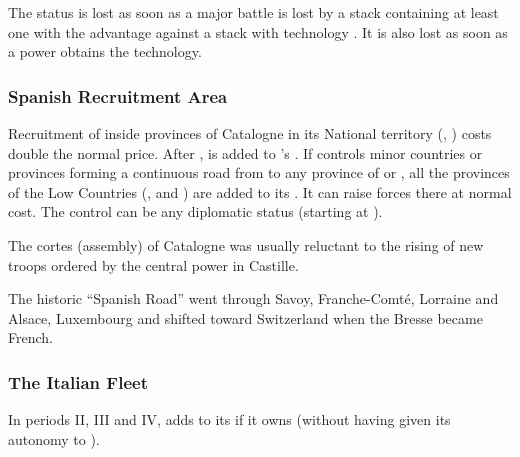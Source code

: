 \aparag The \TTER status is lost as soon as a major battle is lost by a
stack containing at least one \ARMY\faceplus with the \TTER advantage
against a stack with technology \TBAR.
\bparag It is also lost as soon as a power obtains the \TMAN technology.


\subsubsection{Spanish Recruitment Area}\label{chSpecific:Spain:Recruitment
  Area}
 Recruitment of \HIS inside provinces of
Catalogne in its National territory (\provinceCatalunya,
\provincePirineos) costs double the normal price.
 After ,
 is added to \SPA's .
 If \SPA controls minor countries or provinces
forming a continuous road from  to any province of
 or , all the provinces of the Low
Countries (\paysProvincesne, \paysHollande and \paysBourgogne) are added
to its . It can raise forces there at normal
cost. The control can be any diplomatic status (starting at \RM).
\begin{histoire}
  The cortes (assembly) of Catalogne was usually reluctant to the rising
  of new troops ordered by the central power in Castille.

  The historic ``Spanish Road'' went through Savoy, Franche-Comt\'e,
  Lorraine and Alsace, Luxembourg and shifted toward Switzerland when
  the Bresse became French.
\end{histoire}


\subsubsection{The Italian Fleet}\label{chSpecific:Spain:Italian Fleet}
In periods II, III and IV, \SPA adds \FLEET\facemoins to its
 if it owns  (without having
given its autonomy to ).


